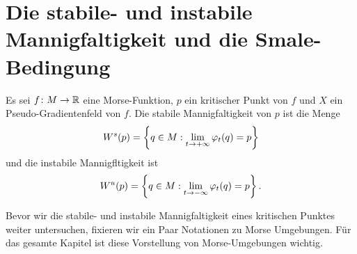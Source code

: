 \section{Die stabile- und instabile Mannigfaltigkeit und die Smale-Bedingung}

\begin{definition}
    \label{def: stabile und instabile mannigfaltigkeit}
    Es sei $f \colon M \to { \mathbb R }$ eine Morse-Funktion, $p$ ein kritischer Punkt von $f$ und $X$ ein
    Pseudo-Gradientenfeld von $f$. Die stabile Mannigfaltigkeit von $p$ ist die Menge
    \[ { W^s } (p) = \left\{ q \in M : \lim_{t \to + \infty} \varphi_t(q) = p \right\} \]
    und die instabile Mannigfltigkeit ist
    \[ { W^u } (p) = \left\{ q \in M : \lim_{t \to - \infty} \varphi_t(q) = p \right\} . \]
\end{definition}

Bevor wir die stabile- und instabile Mannigfaltigkeit eines kritischen Punktes weiter untersuchen, 
fixieren wir ein Paar Notationen zu Morse Umgebungen. Für das gesamte Kapitel ist diese Vorstellung
von Morse-Umgebungen wichtig.

